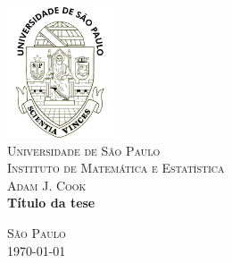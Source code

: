 \begin{titlepage}
\begin{center}

\includegraphics[width=0.25\textwidth]{images/usp}~\\[1cm]
\textsc{\LARGE Universidade de São Paulo}\\[0.5cm]

\textsc{\Large Instituto de Matemática e Estatística}\\[2.5cm]

\textsc{\Large Adam J. Cook}\\[1.0cm]

\LARGE \bfseries Título da tese \\[1.5cm]

\vfill

\textsc{\Large São Paulo}\\
{\large \today}

\end{center}
\end{titlepage}